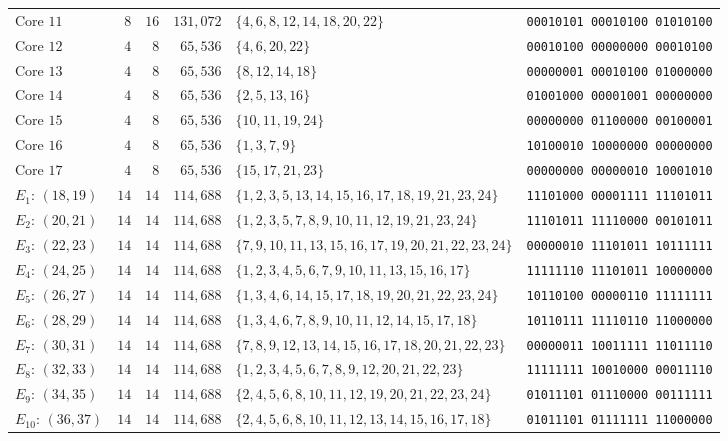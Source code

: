 \documentclass[
  aps,
  pra,
  reprint,
  superscriptaddress,
  amsmath,
  amssymb,
  nofootinbib,
  floatfix
]{revtex4-2}
\theoremstyle{definition}
\theoremstyle{remark}
\begin{document}
\begin{table}[t]
\begin{ruledtabular}
\begin{tabular}{lrrrlc}
Core $11$ & $8$ & $16$ & $131{,}072$ & $\{4,6,8,12,14,18,20,22\}$ & \texttt{00010101\,00010100\,01010100} \\
Core $12$ & $4$ & $8$ & $65{,}536$ & $\{4,6,20,22\}$ & \texttt{00010100\,00000000\,00010100} \\
Core $13$ & $4$ & $8$ & $65{,}536$ & $\{8,12,14,18\}$ & \texttt{00000001\,00010100\,01000000} \\
Core $14$ & $4$ & $8$ & $65{,}536$ & $\{2,5,13,16\}$ & \texttt{01001000\,00001001\,00000000} \\
Core $15$ & $4$ & $8$ & $65{,}536$ & $\{10,11,19,24\}$ & \texttt{00000000\,01100000\,00100001} \\
Core $16$ & $4$ & $8$ & $65{,}536$ & $\{1,3,7,9\}$ & \texttt{10100010\,10000000\,00000000} \\
Core $17$ & $4$ & $8$ & $65{,}536$ & $\{15,17,21,23\}$ & \texttt{00000000\,00000010\,10001010} \\ \hline
$E_{1}:\,(18,19)$ & $14$ & $14$ & $114{,}688$ & $\{1,2,3,5,13,14,15,16,17,18,19,21,23,24\}$ & \texttt{11101000\,00001111\,11101011} \\
$E_{2}:\,(20,21)$ & $14$ & $14$ & $114{,}688$ & $\{1,2,3,5,7,8,9,10,11,12,19,21,23,24\}$ & \texttt{11101011\,11110000\,00101011} \\
$E_{3}:\,(22,23)$ & $14$ & $14$ & $114{,}688$ & $\{7,9,10,11,13,15,16,17,19,20,21,22,23,24\}$ & \texttt{00000010\,11101011\,10111111} \\
$E_{4}:\,(24,25)$ & $14$ & $14$ & $114{,}688$ & $\{1,2,3,4,5,6,7,9,10,11,13,15,16,17\}$ & \texttt{11111110\,11101011\,10000000} \\
$E_{5}:\,(26,27)$ & $14$ & $14$ & $114{,}688$ & $\{1,3,4,6,14,15,17,18,19,20,21,22,23,24\}$ & \texttt{10110100\,00000110\,11111111} \\
$E_{6}:\,(28,29)$ & $14$ & $14$ & $114{,}688$ & $\{1,3,4,6,7,8,9,10,11,12,14,15,17,18\}$ & \texttt{10110111\,11110110\,11000000} \\
$E_{7}:\,(30,31)$ & $14$ & $14$ & $114{,}688$ & $\{7,8,9,12,13,14,15,16,17,18,20,21,22,23\}$ & \texttt{00000011\,10011111\,11011110} \\
$E_{8}:\,(32,33)$ & $14$ & $14$ & $114{,}688$ & $\{1,2,3,4,5,6,7,8,9,12,20,21,22,23\}$ & \texttt{11111111\,10010000\,00011110} \\
$E_{9}:\,(34,35)$ & $14$ & $14$ & $114{,}688$ & $\{2,4,5,6,8,10,11,12,19,20,21,22,23,24\}$ & \texttt{01011101\,01110000\,00111111} \\
$E_{10}:\,(36,37)$ & $14$ & $14$ & $114{,}688$ & $\{2,4,5,6,8,10,11,12,13,14,15,16,17,18\}$ & \texttt{01011101\,01111111\,11000000} \\

\end{tabular}
\end{ruledtabular}
\end{table}
\end{document}
